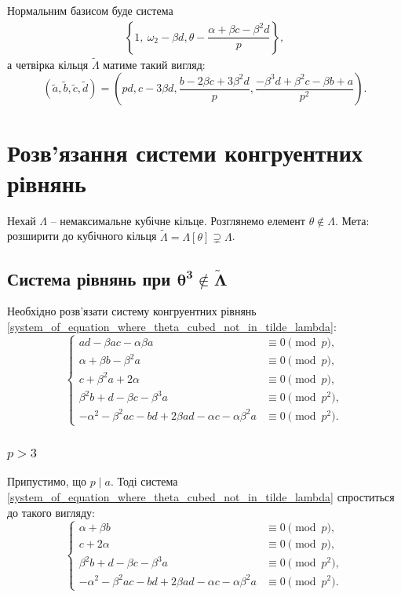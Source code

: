 \documentclass{thesis}
\begin{document}
Нормальним базисом буде система
\begin{align*}
\left\{ 1,\ \omega_2 - \beta d, \theta - \dfrac{\alpha + \beta c - \beta^2 d}{p} \right\},
\end{align*}
а четвірка кільця $\tilde{\Lambda}$ матиме такий вигляд:
\begin{equation}
\left( \tilde{a},\tilde{b},\tilde{c},\tilde{d}\right) = \left( pd, c - 3 \beta d, \dfrac{b \!- 2\beta c \!+ 3 \beta^2 d}{p}, \dfrac{-\beta^3 d \!+ \beta^2 c \!- \beta b \!+ a}{p^2}\right).
\end{equation}
\newpage

\chapter{Розв'язання системи конгруентних рівнянь}\label{chaper2}
Нехай $\Lambda$ -- немаксимальне кубічне кільце. Розглянемо елемент $\theta \notin \Lambda$. Мета: розширити до кубічного кільця $\tilde{\Lambda} = \Lambda[\theta] \supsetneq \Lambda$.

\section{Система рівнянь при $\boldsymbol{\theta^3 \notin \tilde{\Lambda}}$}
Необхідно розв'язати систему конгруентних рівнянь \eqref{system_of_equation_where_theta_cubed_not_in_tilde_lambda}:
\begin{equation*}
\begin{cases}
ad - \beta ac - \alpha \beta a & \equiv 0 \pmod p, \\
\alpha + \beta b - \beta^2 a & \equiv 0 \pmod p, \\
c +\beta^2 a + 2\alpha & \equiv 0 \pmod p, \\
\beta^2 b + d - \beta c - \beta^3 a & \equiv 0 \pmod {p^2}, \\
-\alpha^2 - \beta^2 ac - bd + 2 \beta a d - \alpha c - \alpha \beta^2 a & \equiv 0 \pmod {p^2}.
\end{cases}
\end{equation*}

\subsection*{$p > 3$}
Припустимо, що $p \mid a$. Тоді система \eqref{system_of_equation_where_theta_cubed_not_in_tilde_lambda} спроститься до такого вигляду:
\begin{equation}\label{system_two_one_case_when_p_divides_a}
\begin{cases}
\alpha + \beta b & \equiv 0 \pmod p, \\
c + 2\alpha & \equiv 0 \pmod p, \\
\beta^2 b + d - \beta c - \beta^3 a & \equiv 0 \pmod {p^2}, \\
-\alpha^2 - \beta^2 ac - bd + 2 \beta a d - \alpha c - \alpha \beta^2 a & \equiv 0 \pmod {p^2}.
\end{cases}
\end{equation}
\end{document}
